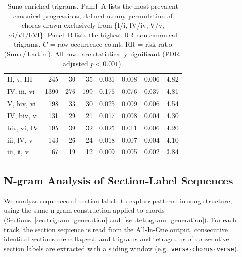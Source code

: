 \documentclass{article}
\begin{document}
\begin{table}[!ht]
\begin{tabular}{@{}lrrrrrrc@{}}
II, v, III   &   245 &  30 &  35 & 0.031 & 0.008 & 0.006 & 4.82 \\
IV, iii, vi  & 1390 & 276 & 199 & 0.176 & 0.076 & 0.037 & 4.81 \\
V, biv, vi   &   198 &  33 &  30 & 0.025 & 0.009 & 0.006 & 4.54 \\
IV, biv, vi  &   131 &  29 &  21 & 0.017 & 0.008 & 0.004 & 4.30 \\
biv, vi, IV  &   195 &  39 &  32 & 0.025 & 0.011 & 0.006 & 4.20 \\
iii, IV, v   &   143 &  26 &  24 & 0.018 & 0.007 & 0.004 & 4.10 \\
iii, ii, v   &    67 &  19 &  12 & 0.009 & 0.005 & 0.002 & 3.84 \\
\bottomrule
\end{tabular}
\caption{Suno-enriched trigrams. Panel~A lists the most prevalent canonical progressions, defined as any permutation of chords drawn exclusively from \{I/i, IV/iv, V/v, vi/VI/bVI\}. Panel~B lists the highest RR non-canonical trigrams. $C$ = raw occurrence count; RR = risk ratio (Suno\,/\,Lastfm). All rows are statistically significant (FDR-adjusted $p < 0.001$).}
\label{tab:suno_enrichment}
\end{table}

\subsection{N-gram Analysis of Section-Label Sequences}
\label{sec:form_ngram}

We analyze sequences of section labels to explore patterns in song structure, using the same n-gram construction applied to chords (Sections~\ref{sec:trigram_generation} and~\ref{sec:tetragram_generation}).
For each track, the section sequence is read from the All-In-One output, consecutive identical sections are collapsed, and trigrams and tetragrams of consecutive section labels are extracted with a sliding window (e.g.\ \texttt{verse·chorus·verse}).
\end{document}

